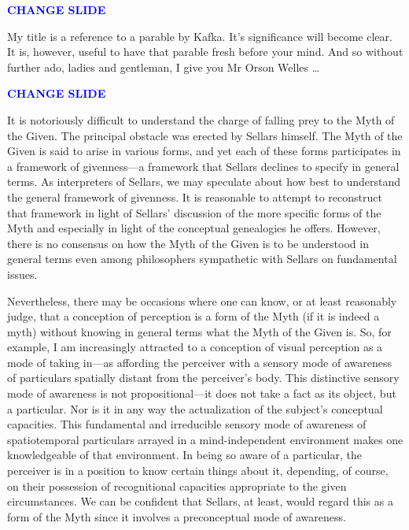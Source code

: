 \documentclass[12pt]{article}
\title{\mytitle}%
\author{\myauthor}
\date{} %
\newcommand{\change}{\textcolor{blue}{\textbf{CHANGE SLIDE}}}
\begin{document}
\maketitle


\setlength{\parindent}{1em}

\change

My title is a reference to a parable by Kafka. It's significance will become clear. It is, however, useful to have that parable fresh before your mind. And so without further ado, ladies and gentleman, I give you Mr Orson Welles \ldots\ 

\change

\noindent It is notoriously difficult to understand the charge of falling prey to the Myth of the Given. The principal obstacle was erected by Sellars himself. The Myth of the Given is said to arise in various forms, and yet each of these forms participates in a framework of givenness---a framework that Sellars declines to specify in general terms. As interpreters of Sellars, we may speculate about how best to understand the general framework of givenness. It is reasonable to attempt to reconstruct that framework in light of Sellars' discussion of the more specific forms of the Myth and especially in light of the conceptual genealogies he offers. However, there is no consensus on how the Myth of the Given is to be understood in general terms even among philosophers sympathetic with Sellars on fundamental issues.

Nevertheless, there may be occasions where one can know, or at least reasonably judge, that a conception of perception is a form of the Myth (if it is indeed a myth) without knowing in general terms what the Myth of the Given is. So, for example, I am increasingly attracted to a conception of visual perception as a mode of taking in---as affording the perceiver with a sensory mode of awareness of particulars spatially distant from the perceiver's body. This distinctive sensory mode of awareness is not propositional---it does not take a fact as its object, but a particular. Nor is it in any way the actualization of the subject's conceptual capacities. This fundamental and irreducible sensory mode of awareness of spatiotemporal particulars arrayed in a mind-independent environment makes one knowledgeable of that environment. In being so aware of a particular, the perceiver is in a position to know certain things about it, depending, of course, on their possession of recognitional capacities appropriate to the given circumstances. We can be confident that Sellars, at least, would regard this as a form of the Myth since it involves a preconceptual mode of awareness.
\end{document}
